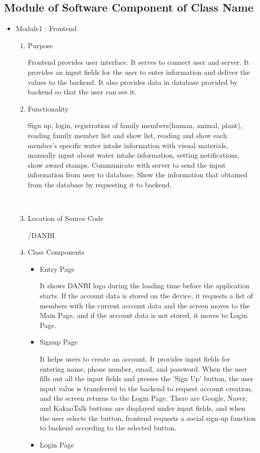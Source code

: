 \documentclass[conference]{IEEEtran}
\begin{document}
\subsection{Module of Software Component of Class Name}
\setlength{\parindent}{2ex}

\begin{itemize}
    \item Module1 : Frontend
    \begin{enumerate}
    \setlength{\parindent}{2ex}
    \setlength{\parskip}{0.5em}
        \item Purpose
        
        Frontend provides user interface. It serves to connect user and server. It provides an input fields for the user to enter information and deliver the values to the backend. It also provides data in database provided by backend so that the user can see it.
        \item Functionality
        
        Sign up, login, registration of family members(human, animal, plant), reading family member list and show list, reading and show each member's specific water intake information with visual materials, manually input about water intake information, setting notifications, show award stamps. Communicate with server to send the input information from user to database. Show the information that obtained from the database by requesting it to backend.
        
        \ 
        
        \item Location of Source Code
        
        /DANBI
        \item Class Components
        \begin{itemize}
            \item Entry Page
            \setlength{\parindent}{2ex}
            
            It shows DANBI logo during the loading time before the application starts. If the account data is stored on the device, it requests a list of members with the current account data and the screen moves to the Main Page, and if the account data is not stored, it moves to Login Page.
            \item Signup Page
            \setlength{\parindent}{2ex}
            
            It helps users to create an account. It provides input fields for entering name, phone number, email, and password. When the user fills out all the input fields and presses the 'Sign Up' button, the user input value is transferred to the backend to request account creation, and the screen returns to the Login Page. There are Google, Naver, and KakaoTalk buttons are displayed under input fields, and when the user selects the button, frontend requests a social sign-up function to backend according to the selected button.
            \item Login Page
            \setlength{\parindent}{2ex}
            

\end{itemize}
\end{enumerate}
\end{itemize}
\end{document}
